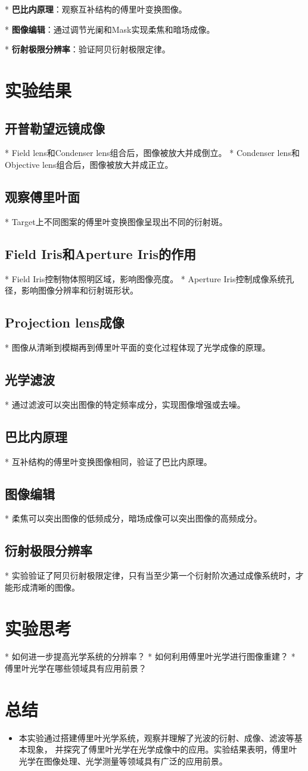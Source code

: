 \documentclass{ctexart}
\begin{document}
    * \textbf{巴比内原理}：观察互补结构的傅里叶变换图像。
    
    * \textbf{图像编辑}：通过调节光阑和Mask实现柔焦和暗场成像。
    
    * \textbf{衍射极限分辨率}：验证阿贝衍射极限定律。

\section{实验结果}
\subsection{开普勒望远镜成像}
* Field lens和Condenser lens组合后，图像被放大并成倒立。
* Condenser lens和Objective lens组合后，图像被放大并成正立。
\subsection{观察傅里叶面}
* Target上不同图案的傅里叶变换图像呈现出不同的衍射斑。
\subsection{Field Iris和Aperture Iris的作用}
* Field Iris控制物体照明区域，影响图像亮度。
* Aperture Iris控制成像系统孔径，影响图像分辨率和衍射斑形状。
\subsection{Projection lens成像}
* 图像从清晰到模糊再到傅里叶平面的变化过程体现了光学成像的原理。
\subsection{光学滤波}
* 通过滤波可以突出图像的特定频率成分，实现图像增强或去噪。
\subsection{巴比内原理}
* 互补结构的傅里叶变换图像相同，验证了巴比内原理。
\subsection{图像编辑}
* 柔焦可以突出图像的低频成分，暗场成像可以突出图像的高频成分。
\subsection{衍射极限分辨率}
* 实验验证了阿贝衍射极限定律，只有当至少第一个衍射阶次通过成像系统时，才能形成清晰的图像。

\section{实验思考}
* 如何进一步提高光学系统的分辨率？
* 如何利用傅里叶光学进行图像重建？
* 傅里叶光学在哪些领域具有应用前景？

\section{总结}
\begin{itemize}
  \item 本实验通过搭建傅里叶光学系统，观察并理解了光波的衍射、成像、滤波等基本现象，
  并探究了傅里叶光学在光学成像中的应用。实验结果表明，傅里叶光学在图像处理、光学测量等领域具有广泛的应用前景。

\end{itemize}
\end{document}
